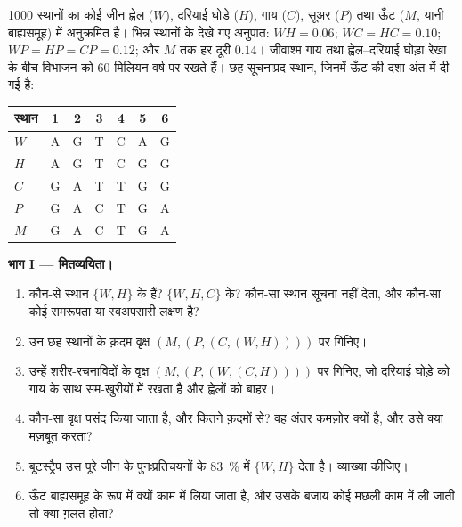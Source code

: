 \begin{problem}
\label{pb:b2:phylogenetic-trees:1}
\num{1000} स्थानों का कोई जीन ह्वेल ($W$), दरियाई घोड़े
($H$), गाय ($C$), सूअर ($P$) तथा ऊँट ($M$, यानी बाह्यसमूह) में अनुक्रमित है। भिन्न स्थानों के
देखे गए अनुपात: $WH = 0.06$; $WC = HC = 0.10$; $WP =
HP = CP = 0.12$; और $M$ तक हर दूरी $0.14$। जीवाश्म
गाय तथा ह्वेल--दरियाई घोड़ा रेखा के बीच विभाजन को 60 मिलियन वर्ष पर रखते हैं।
छह सूचनाप्रद स्थान, जिनमें ऊँट की दशा अंत में दी गई है:
\begin{center}
\begin{tabular}{l@{\quad}cccccc}
स्थान & 1 & 2 & 3 & 4 & 5 & 6 \\ \hline
$W$ & A & G & T & C & A & G \\
$H$ & A & G & T & C & G & G \\
$C$ & G & A & T & T & G & G \\
$P$ & G & A & C & T & G & A \\
$M$ & G & A & C & T & G & A \\
\end{tabular}
\end{center}

\medskip
\noindent\textbf{भाग I --- मितव्ययिता।}
\begin{enumerate}
  \item कौन-से स्थान $\{W, H\}$ के  हैं? $\{W, H,
        C\}$ के? कौन-सा स्थान सूचना नहीं देता, और कौन-सा कोई समरूपता
        या स्वअपसारी लक्षण है?
  \item उन छह स्थानों के क़दम वृक्ष
        $(M,(P,(C,(W,H))))$ पर गिनिए।
  \item उन्हें शरीर-रचनाविदों के वृक्ष $(M,(P,(W,(C,H))))$ पर गिनिए,
        जो दरियाई घोड़े को गाय के साथ सम-खुरीयों में रखता है और
        ह्वेलों को बाहर।
  \item कौन-सा वृक्ष पसंद किया जाता है, और कितने क़दमों से? वह
        अंतर कमज़ोर क्यों है, और उसे क्या मज़बूत करता?
  \item बूटस्ट्रैप उस पूरे जीन के पुनःप्रतिचयनों के \qty{83}{\%} में
        $\{W, H\}$  देता है। व्याख्या कीजिए।
  \item ऊँट बाह्यसमूह के रूप में क्यों काम में लिया जाता है, और उसके बजाय कोई मछली
        काम में ली जाती तो क्या ग़लत होता?
\end{enumerate}


\end{problem}
